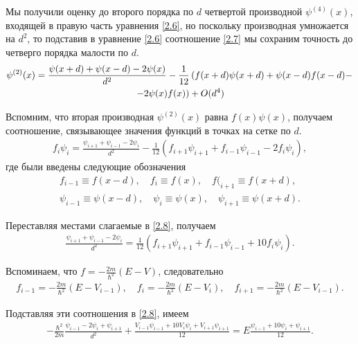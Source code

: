 \documentclass[14pt]{extarticle}
\newcommand{\lb}{\left(}
\newcommand{\rb}{\right)}
\newcommand{\psider}[1]{\psi^{(#1)}(x)}
\begin{document}
Мы получили оценку до второго порядка по $d$ четвертой производной $\psider{4}$, входящей в правую часть уравнения \eqref{2.6}, но поскольку производная умножается на $d^2$, то подставив в уравнение \eqref{2.6} соотношение \eqref{2.7} мы сохраним точность до четверго порядка малости по $d$.
\begin{gather}
	\psider{2} = \frac{\psi(x + d) + \psi(x - d) - 2 \psi(x)}{d^2} - \frac{1}{12} \lb f(x + d) \psi(x + d) + \psi(x - d) f(x - d) - \right. \notag \\
	\left. - 2 \psi(x) f(x) \rb + O(d^4) \label{2.7.2} 
\end{gather}

Вспомним, что вторая производная $\psider{2}$ равна $f(x)\psi(x)$,  получаем соотношение, связывающее значения функций в точках на сетке по $d$. 
\begin{gather}
	f_i \psi_i = \frac{\psi_{i + 1} + \psi_{i - 1} - 2 \psi_i}{d^2} - \frac{1}{12} \lb f_{i + 1} \psi_{i + 1} + f_{i - 1} \psi_{i - 1} - 2 f_i \psi_i \rb \label{2.8},
\end{gather}
где были введены следующие обозначения
\begin{gather}
	f_{i - 1} \equiv f(x - d), \quad f_i \equiv f(x), \quad f(_{i + 1} \equiv f(x + d) \label{2.8.1},\\ 
	\psi_{i - 1} \equiv \psi(x - d), \quad \psi_i \equiv \psi(x), \quad \psi_{i + 1} \equiv \psi(x + d). \label{2.8.2}
\end{gather}

Переставляя местами слагаемые в \eqref{2.8}, получаем
\begin{gather}
	\frac{\psi_{i + 1} + \psi_{i - 1} - 2 \psi_i}{d^2} = \frac{1}{12} \lb f_{i + 1} \psi_{i + 1} + f_{i - 1} \psi_{i - 1} + 10 f_i \psi_i \rb. \label{2.9}
\end{gather}

Вспоминаем, что $\displaystyle f = - \frac{2m}{\hbar^2} ( E - V )$, следовательно
\begin{gather}
	f_{i - 1} = - \frac{2m}{\hbar^2} (E - V_{i - 1}), \quad f_i = - \frac{2m}{\hbar^2} (E - V_i), \quad f_{i + 1} = - \frac{2m}{\hbar^2}(E - V_{i - 1}). \label{2.9.2}
\end{gather}

Подставляя эти соотношения в \eqref{2.8}, имеем
\begin{gather}
	- \frac{\hbar^2}{2m} \frac{\psi_{i - 1} - 2 \psi_i + \psi_{i + 1}}{d^2} + \frac{V_{i - 1} \psi_{i - 1} + 10 V_i \psi_i + V_{i + 1} \psi_{i + 1}}{12} = E \frac{\psi_{i - 1} + 10 \psi_i + \psi_{i + 1}}{12}. \label{2.10}
\end{gather}
\end{document}

